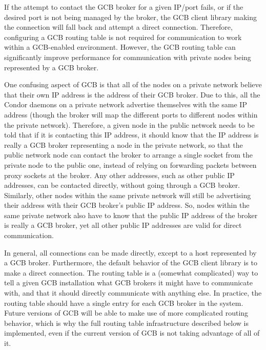 If the attempt to contact the GCB broker for a given IP/port fails, or
if the desired port is not being managed by the broker, the GCB client
library making the connection will fall back and attempt a direct
connection.
Therefore, configuring a GCB routing table is not required for
communication to work within a GCB-enabled environment.
However, the GCB routing table can significantly improve performance
for communication with private nodes being represented by a GCB
broker. 

One confusing aspect of GCB is that all of the nodes on a private
network believe that their own IP address is the address of their GCB
broker.
Due to this, all the Condor daemons on a private network advertise
themselves with the same IP address (though the broker will map the
different ports to different nodes within the private network).
Therefore, a given node in the public network needs to be told that if
it is contacting this IP address, it should know that the IP address is really
a GCB broker representing a node in the private network, so that 
the public network node
can contact the broker to arrange a single socket from the private
node to the public one, instead of relying on forwarding packets
between proxy sockets at the broker.
Any other addresses, such as other public IP addresses, can be
contacted directly, without going through a GCB broker.
Similarly, other nodes within the same private network will still be
advertising their address with their GCB broker's public IP address.
So, nodes within the same private network also have to know that the
public IP address of the broker is really a GCB broker, yet all other public
IP addresses are valid for direct communication.

In general, all connections can be made directly, except to a host
represented by a GCB broker.
Furthermore, the default behavior of the GCB client library is to make
a direct connection.
The routing table is a (somewhat complicated) way to tell a
given GCB installation what GCB brokers it might have to communicate
with, and that it should directly communicate with anything else.
In practice, the routing table should have a single entry for
each GCB broker in the system.
Future versions of GCB will be able to make use of more complicated
routing behavior, which is why the full routing table infrastructure
described below is implemented, even if the current version of GCB is
not taking advantage of all of it.



